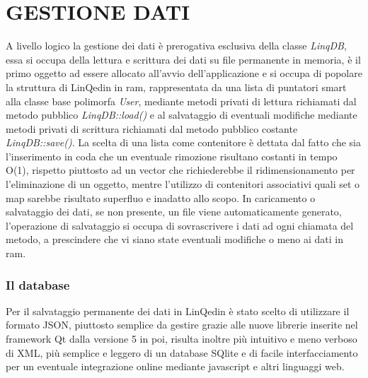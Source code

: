 \section*{GESTIONE DATI}
A livello logico la gestione dei dati è prerogativa esclusiva della classe \textit{LinqDB}, essa si occupa della lettura e scrittura dei dati
su file permanente in memoria, è il primo oggetto ad essere allocato all'avvio dell'applicazione e si occupa di popolare la struttura di
LinQedin in ram, rappresentata da una lista di puntatori smart alla classe base polimorfa \textit{User}, mediante metodi privati di lettura
richiamati dal metodo pubblico \textit{LinqDB::load()} e al salvataggio di eventuali modifiche mediante metodi privati di scrittura richiamati
dal metodo pubblico costante \textit{LinqDB::save()}.
La scelta di una lista come contenitore è dettata dal fatto che sia l'inserimento in coda che un eventuale rimozione risultano costanti in tempo O(1),
rispetto piuttosto ad un vector che richiederebbe il ridimensionamento per l'eliminazione di un oggetto, mentre l'utilizzo di contenitori associativi
quali set o map sarebbe risultato superfluo e inadatto allo scopo.
In caricamento o salvataggio dei dati, se non presente, un file viene automaticamente generato, l'operazione di salvataggio si occupa di sovrascrivere
i dati ad ogni chiamata del metodo, a prescindere che vi siano state eventuali modifiche o meno ai dati in ram.
\subsubsection*{Il database}
Per il salvataggio permanente dei dati in LinQedin è stato scelto di utilizzare il formato JSON, piuttosto semplice da gestire grazie alle
nuove librerie inserite nel framework Qt dalla versione 5 in poi, risulta inoltre più intuitivo e meno verboso di XML, più semplice e leggero
di un database SQlite e di facile interfacciamento per un eventuale integrazione online mediante javascript e altri linguaggi web.